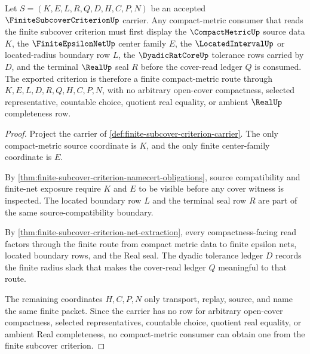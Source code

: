 \begin{theorem}
\label{thm:finite-subcover-criterion-compact-metric-consumer}
Let $S=(K,E,L,R,Q,D,H,C,P,N)$ be an accepted $\FiniteSubcoverCriterionUp$ carrier. Any compact-metric consumer that reads the finite subcover criterion must first display the $\CompactMetricUp$ source data $K$, the $\FiniteEpsilonNetUp$ center family $E$, the $\LocatedIntervalUp$ or located-radius boundary row $L$, the $\DyadicRatCoreUp$ tolerance rows carried by $D$, and the terminal $\RealUp$ seal $R$ before the cover-read ledger $Q$ is consumed. The exported criterion is therefore a finite compact-metric route through $K,E,L,D,R,Q,H,C,P,N$, with no arbitrary open-cover compactness, selected representative, countable choice, quotient real equality, or ambient $\RealUp$ completeness row.
\end{theorem}
\begin{proof}
Project the carrier of \autoref{def:finite-subcover-criterion-carrier}. The only compact-metric source coordinate is $K$, and the only finite center-family coordinate is $E$.

By \autoref{thm:finite-subcover-criterion-namecert-obligations}, source compatibility and finite-net exposure require $K$ and $E$ to be visible before any cover witness is inspected. The located boundary row $L$ and the terminal seal row $R$ are part of the same source-compatibility boundary.

By \autoref{thm:finite-subcover-criterion-net-extraction}, every compactness-facing read factors through the finite route from compact metric data to finite epsilon nets, located boundary rows, and the Real seal. The dyadic tolerance ledger $D$ records the finite radius slack that makes the cover-read ledger $Q$ meaningful to that route.

The remaining coordinates $H,C,P,N$ only transport, replay, source, and name the same finite packet. Since the carrier has no row for arbitrary open-cover compactness, selected representatives, countable choice, quotient real equality, or ambient Real completeness, no compact-metric consumer can obtain one from the finite subcover criterion.
\end{proof}


